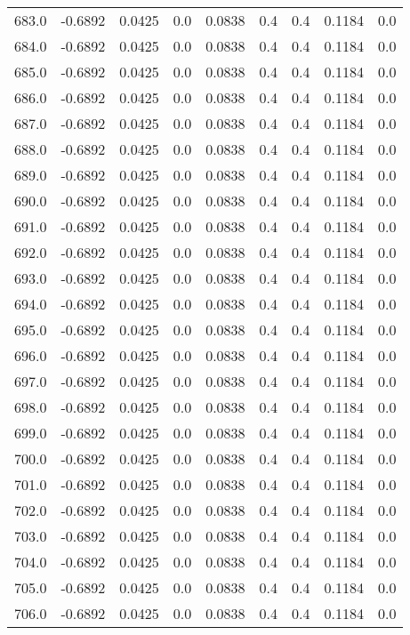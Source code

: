 \begin{longtable}{lrrrrrrrr}
683.0 & -0.6892 & 0.0425 & 0.0 & 0.0838 & 0.4 & 0.4 & 0.1184 & 0.0 \\
684.0 & -0.6892 & 0.0425 & 0.0 & 0.0838 & 0.4 & 0.4 & 0.1184 & 0.0 \\
685.0 & -0.6892 & 0.0425 & 0.0 & 0.0838 & 0.4 & 0.4 & 0.1184 & 0.0 \\
686.0 & -0.6892 & 0.0425 & 0.0 & 0.0838 & 0.4 & 0.4 & 0.1184 & 0.0 \\
687.0 & -0.6892 & 0.0425 & 0.0 & 0.0838 & 0.4 & 0.4 & 0.1184 & 0.0 \\
688.0 & -0.6892 & 0.0425 & 0.0 & 0.0838 & 0.4 & 0.4 & 0.1184 & 0.0 \\
689.0 & -0.6892 & 0.0425 & 0.0 & 0.0838 & 0.4 & 0.4 & 0.1184 & 0.0 \\
690.0 & -0.6892 & 0.0425 & 0.0 & 0.0838 & 0.4 & 0.4 & 0.1184 & 0.0 \\
691.0 & -0.6892 & 0.0425 & 0.0 & 0.0838 & 0.4 & 0.4 & 0.1184 & 0.0 \\
692.0 & -0.6892 & 0.0425 & 0.0 & 0.0838 & 0.4 & 0.4 & 0.1184 & 0.0 \\
693.0 & -0.6892 & 0.0425 & 0.0 & 0.0838 & 0.4 & 0.4 & 0.1184 & 0.0 \\
694.0 & -0.6892 & 0.0425 & 0.0 & 0.0838 & 0.4 & 0.4 & 0.1184 & 0.0 \\
695.0 & -0.6892 & 0.0425 & 0.0 & 0.0838 & 0.4 & 0.4 & 0.1184 & 0.0 \\
696.0 & -0.6892 & 0.0425 & 0.0 & 0.0838 & 0.4 & 0.4 & 0.1184 & 0.0 \\
697.0 & -0.6892 & 0.0425 & 0.0 & 0.0838 & 0.4 & 0.4 & 0.1184 & 0.0 \\
698.0 & -0.6892 & 0.0425 & 0.0 & 0.0838 & 0.4 & 0.4 & 0.1184 & 0.0 \\
699.0 & -0.6892 & 0.0425 & 0.0 & 0.0838 & 0.4 & 0.4 & 0.1184 & 0.0 \\
700.0 & -0.6892 & 0.0425 & 0.0 & 0.0838 & 0.4 & 0.4 & 0.1184 & 0.0 \\
701.0 & -0.6892 & 0.0425 & 0.0 & 0.0838 & 0.4 & 0.4 & 0.1184 & 0.0 \\
702.0 & -0.6892 & 0.0425 & 0.0 & 0.0838 & 0.4 & 0.4 & 0.1184 & 0.0 \\
703.0 & -0.6892 & 0.0425 & 0.0 & 0.0838 & 0.4 & 0.4 & 0.1184 & 0.0 \\
704.0 & -0.6892 & 0.0425 & 0.0 & 0.0838 & 0.4 & 0.4 & 0.1184 & 0.0 \\
705.0 & -0.6892 & 0.0425 & 0.0 & 0.0838 & 0.4 & 0.4 & 0.1184 & 0.0 \\
706.0 & -0.6892 & 0.0425 & 0.0 & 0.0838 & 0.4 & 0.4 & 0.1184 & 0.0 \\

\end{longtable}
